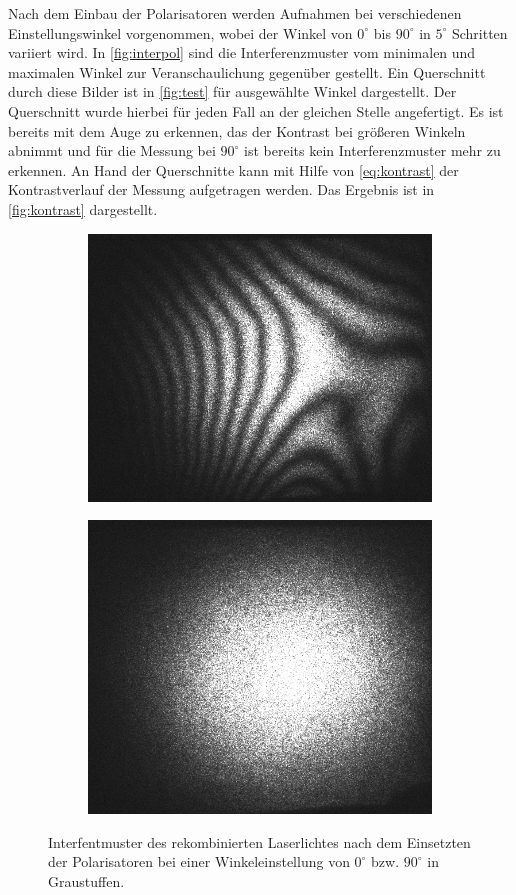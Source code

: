 \documentclass[numbers=noenddot,a4paper,notitlepage,twoside,BCOR15mm]{scrartcl}
\begin{document}
Nach dem Einbau der Polarisatoren werden Aufnahmen bei verschiedenen Einstellungswinkel vorgenommen, wobei der Winkel von $0^\circ$ bis $90^\circ$ in $5^\circ$ Schritten variiert wird. In \autoref{fig:interpol} sind die Interferenzmuster vom minimalen und maximalen Winkel zur Veranschaulichung gegenüber gestellt. Ein Querschnitt durch diese Bilder ist in \autoref{fig:test} für ausgewählte Winkel dargestellt. Der Querschnitt wurde hierbei für jeden Fall an der gleichen Stelle angefertigt. Es ist bereits mit dem Auge zu erkennen, das der Kontrast bei größeren Winkeln abnimmt und für die Messung bei $90^\circ$ ist bereits kein Interferenzmuster mehr zu erkennen. An Hand der Querschnitte kann mit Hilfe von \autoref{eq:kontrast} der Kontrastverlauf der Messung aufgetragen werden. Das Ergebnis ist in \autoref{fig:kontrast} dargestellt.

\begin{figure}
	\centering
	\begin{subfigure}{.49\textwidth}
			\centering
			\includegraphics[width=.7\linewidth]{pics/0grad_.png}
	\end{subfigure}
	\begin{subfigure}{.45\textwidth}
		\centering
		\includegraphics[width=.7\linewidth]{pics/90grad_.png}
	\end{subfigure}	
	\caption{Interfentmuster des rekombinierten Laserlichtes nach dem Einsetzten der Polarisatoren bei einer Winkeleinstellung von $0^\circ$ bzw. $90^\circ$ in Graustuffen.}
	\label{fig:interpol}
\end{figure}
\end{document}
